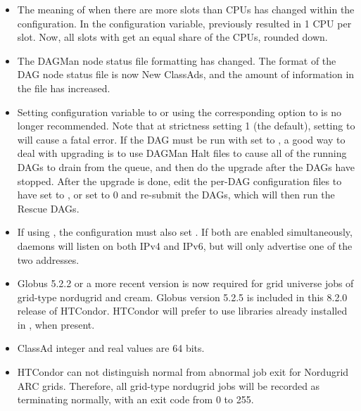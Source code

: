 \begin{itemize}
\item The meaning of  when there are more 
slots than CPUs has changed within the configuration. 
In the  configuration variable,
 previously resulted in 1 CPU per slot. 
Now, all slots with  get an equal share of the CPUs, 
rounded down.

\item The DAGMan node status file formatting has changed.
The format of the DAG node status file is now New ClassAds,
and the amount of information in the file has increased.

\item Setting configuration variable
 to 
or using the corresponding  option
to  is no longer recommended.
Note that at strictness setting 1 (the default), setting
 to 
will cause a fatal error. 
If the DAG must be run with  
set to ,
a good way to deal with upgrading is to use DAGMan Halt files 
to cause all of the running DAGs to drain from the queue, 
and then do the upgrade after the DAGs have stopped.  
After the upgrade is done, 
edit the per-DAG configuration files to have 
 set to ,
or set  to 0 and 
re-submit the DAGs, which will then run the Rescue DAGs.

\item If using , the configuration must
also set .
If both are enabled simultaneously,
daemons will listen on both IPv4 and IPv6, 
but will only advertise one of the two addresses.

\item Globus 5.2.2 or a more recent version is now required 
for grid universe jobs of grid-type nordugrid and cream.
Globus version 5.2.5 is included in this 8.2.0 release of HTCondor.
HTCondor will prefer to use libraries already installed in ,
when present.

\item ClassAd integer and real values are 64 bits.

\item HTCondor can not distinguish normal from abnormal job exit
for Nordugrid ARC grids.
Therefore, all grid-type nordugrid jobs will be recorded as 
terminating normally, with an exit code from 0 to 255.

\end{itemize}

